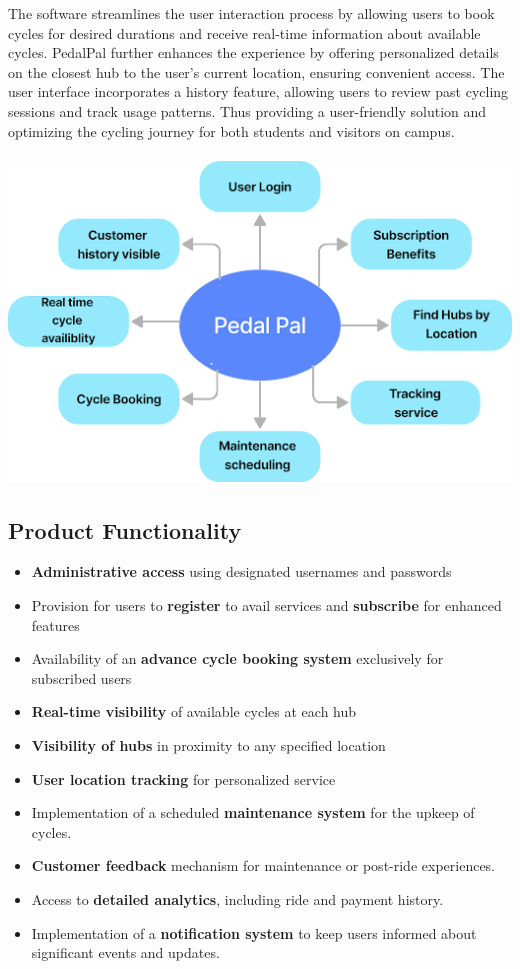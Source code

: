 \documentclass[11pt]{article}
\begin{document}
The software streamlines the user interaction process by allowing users to book cycles for desired durations and receive real-time information about available cycles. PedalPal further enhances the experience by offering personalized details on the closest hub to the user's current location, ensuring convenient access. The user interface incorporates a history feature, allowing users to review past cycling sessions and track usage patterns. Thus providing a user-friendly solution and optimizing the cycling journey for both students and visitors on campus.
\\
\\
\includegraphics[scale=0.9]{Overview.png}

\subsection{Product Functionality}
\begin{itemize}
    \item \textbf{Administrative access} using designated usernames and passwords
    \item Provision for users to \textbf{register} to avail services and \textbf{subscribe} for enhanced features
    \item Availability of an \textbf{advance cycle booking system} exclusively for subscribed users
    \item \textbf{Real-time visibility} of available cycles at each hub
    \item \textbf{Visibility of hubs} in proximity to any specified location
    \item \textbf{User location tracking} for personalized service
    \item Implementation of a scheduled \textbf{maintenance system} for the upkeep of cycles.
    \item \textbf{Customer feedback} mechanism for maintenance or post-ride experiences.
    \item Access to \textbf{detailed analytics}, including ride and payment history.
    \item Implementation of a \textbf{notification system} to keep users informed about significant events and updates.

\end{itemize}
\end{document}
